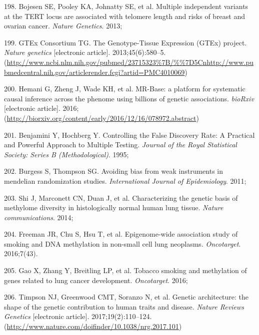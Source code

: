 \documentclass[11pt,oneside]{bristolthesis}
\newenvironment{cslreferences}%
  {}%
  {\par}
\begin{document}
\begin{cslreferences}
\leavevmode\hypertarget{ref-Bojesen2013}{}%
198. Bojesen SE, Pooley KA, Johnatty SE, et al. Multiple independent variants at the TERT locus are associated with telomere length and risks of breast and ovarian cancer. \emph{Nature Genetics}. 2013;

\leavevmode\hypertarget{ref-GTExConsortium2013}{}%
199. GTEx Consortium TG. The Genotype-Tissue Expression (GTEx) project. \emph{Nature genetics} {[}electronic article{]}. 2013;45(6):580--5. (\url{http://www.ncbi.nlm.nih.gov/pubmed/23715323\%7B/\%\%7D5Cnhttp://www.pubmedcentral.nih.gov/articlerender.fcgi?artid=PMC4010069})

\leavevmode\hypertarget{ref-Hemani2016}{}%
200. Hemani G, Zheng J, Wade KH, et al. MR-Base: a platform for systematic causal inference across the phenome using billions of genetic associations. \emph{bioRxiv} {[}electronic article{]}. 2016;(\url{http://biorxiv.org/content/early/2016/12/16/078972.abstract})

\leavevmode\hypertarget{ref-Benjamini1995}{}%
201. Benjamini Y, Hochberg Y. Controlling the False Discovery Rate: A Practical and Powerful Approach to Multiple Testing. \emph{Journal of the Royal Statistical Society: Series B (Methodological)}. 1995;

\leavevmode\hypertarget{ref-Burgess2011}{}%
202. Burgess S, Thompson SG. Avoiding bias from weak instruments in mendelian randomization studies. \emph{International Journal of Epidemiology}. 2011;

\leavevmode\hypertarget{ref-Shi2014}{}%
203. Shi J, Marconett CN, Duan J, et al. Characterizing the genetic basis of methylome diversity in histologically normal human lung tissue. \emph{Nature communications}. 2014;

\leavevmode\hypertarget{ref-Freeman2016}{}%
204. Freeman JR, Chu S, Hsu T, et al. Epigenome-wide association study of smoking and DNA methylation in non-small cell lung neoplasms. \emph{Oncotarget}. 2016;7(43).

\leavevmode\hypertarget{ref-Gao2016}{}%
205. Gao X, Zhang Y, Breitling LP, et al. Tobacco smoking and methylation of genes related to lung cancer development. \emph{Oncotarget}. 2016;

\leavevmode\hypertarget{ref-Timpson2017}{}%
206. Timpson NJ, Greenwood CMT, Soranzo N, et al. Genetic architecture: the shape of the genetic contribution to human traits and disease. \emph{Nature Reviews Genetics} {[}electronic article{]}. 2017;19(2):110--124. (\url{http://www.nature.com/doifinder/10.1038/nrg.2017.101})


\end{cslreferences}
\end{document}
